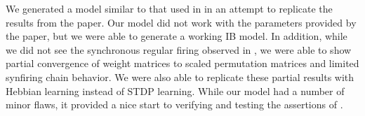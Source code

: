 We generated a model similar to that used in \cite{Fiete} in an attempt to replicate the results from the paper. Our model did not work with the parameters provided by the paper, but we were able to generate a working IB model. In addition, while we did not see the synchronous regular firing observed in \cite{Fiete}, we were able to show partial convergence of weight matrices to scaled permutation matrices and limited synfiring chain behavior. We were also able to replicate these partial results with Hebbian learning instead of STDP learning. While our model had a number of minor flaws, it provided a nice start to verifying and testing the assertions of \cite{Fiete}.